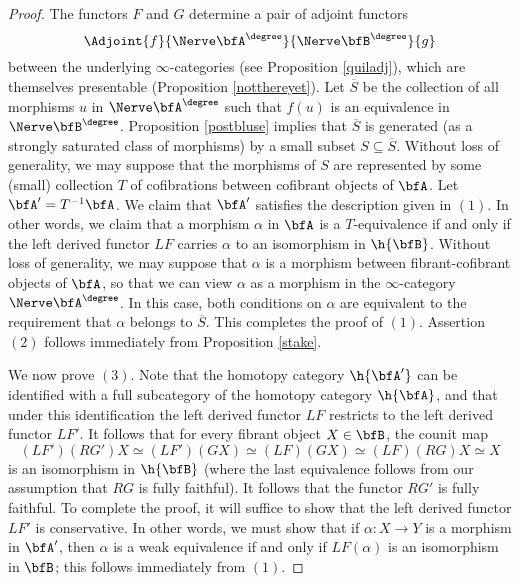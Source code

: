 \begin{Simplicial Categories}
\begin{proof}
The functors $F$ and $G$ determine a pair of adjoint functors 
$$ \Adjoint{f}{\Nerve \bfA^{\degree}}{\Nerve \bfB^{\degree}}{g}$$
between the underlying $\infty$-categories (see Proposition \ref{quiladj}), which
are themselves presentable (Proposition \ref{notthereyet}). Let $\overline{S}$
be the collection of all morphisms $u$ in $\Nerve \bfA^{\degree}$ such that
$f(u)$ is an equivalence in $\Nerve \bfB^{\degree}$. Proposition \ref{postbluse}
implies that $\overline{S}$ is generated (as a strongly saturated class of morphisms)
by a small subset $S \subseteq \overline{S}$. Without loss of generality, we may suppose
that the morphisms of $S$ are represented by some (small) collection $T$ of cofibrations between cofibrant objects of $\bfA$. Let $\bfA' = T^{-1} \bfA$. We claim that $\bfA'$ satisfies
the description given in $(1)$. In other words, we claim that a morphism
$\alpha$ in $\bfA$ is a $T$-equivalence if and only if the left derived functor
$LF$ carries $\alpha$ to an isomorphism in $\h{\bfB}$. Without loss of generality, we may suppose
that $\alpha$ is a morphism between fibrant-cofibrant objects of $\bfA$, so that we can
view $\alpha$ as a morphism in the $\infty$-category $\Nerve \bfA^{\degree}$. In this case, both conditions on $\alpha$ are equivalent to the requirement that $\alpha$ belongs to $\overline{S}$.
This completes the proof of $(1)$. Assertion $(2)$ follows immediately from Proposition \ref{stake}.

We now prove $(3)$. Note that the homotopy category $\h{\bfA'}$ can be identified with a full subcategory of the homotopy category $\h{\bfA}$, and that under this identification the left derived functor $LF$ restricts to the left derived functor $LF'$. It follows that for every fibrant object
$X \in \bfB$, the counit map
$$ (LF')(RG')X \simeq (LF')(GX)
\simeq (LF)(GX) \simeq (LF)(RG)X \simeq X$$
is an isomorphism in $\h{\bfB}$ (where the last equivalence follows from our assumption that $RG$
is fully faithful). It follows that the functor $RG'$ is fully faithful. To complete the proof, it will suffice to show that the left derived functor $LF'$ is conservative. In other words, we must show that
if $\alpha: X \rightarrow Y$ is a morphism in $\bfA'$, then $\alpha$ is a weak equivalence if and only if
$LF(\alpha)$ is an isomorphism in $\bfB$; this follows immediately from $(1)$.
\end{proof}
\end{Simplicial Categories}

